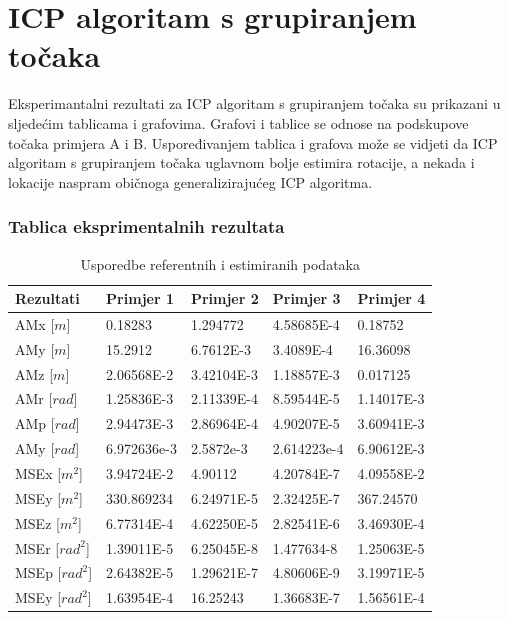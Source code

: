 \section{ICP algoritam s grupiranjem točaka}
Eksperimantalni rezultati za ICP algoritam s grupiranjem točaka su prikazani u sljedećim tablicama i grafovima. Grafovi i tablice se odnose na podskupove točaka primjera A i B. Uspoređivanjem tablica i grafova može se vidjeti da ICP algoritam s grupiranjem točaka uglavnom bolje estimira rotacije, a nekada i lokacije naspram običnoga generalizirajućeg ICP algoritma.

\subsubsection{Tablica eksprimentalnih rezultata}
\begin{table}[H]
  \centering
  \begin{tabular}{ |p{3cm}| |p{2cm}|p{2cm}|p{2cm}|p{2cm}| }
    \hline
    Rezultati& Primjer 1& Primjer 2&Primjer 3& Primjer 4\\
    \hline
    AMx [$m$]& 0.18283& 1.294772& 4.58685E-4& 0.18752\\
    AMy [$m$]& 15.2912& 6.7612E-3& 3.4089E-4& 16.36098\\
    AMz [$m$]& 2.06568E-2& 3.42104E-3& 1.18857E-3& 0.017125\\
    AMr [$rad$]& 1.25836E-3& 2.11339E-4& 8.59544E-5& 1.14017E-3\\
    AMp [$rad$]& 2.94473E-3& 2.86964E-4& 4.90207E-5& 3.60941E-3\\
    AMy [$rad$]& 6.972636e-3& 2.5872e-3& 2.614223e-4& 6.90612E-3\\
    \hline
    MSEx [$m^2$]& 3.94724E-2& 4.90112& 4.20784E-7& 4.09558E-2\\
    MSEy [$m^2$]& 330.869234& 6.24971E-5& 2.32425E-7& 367.24570\\
    MSEz [$m^2$]& 6.77314E-4& 4.62250E-5& 2.82541E-6& 3.46930E-4\\
    MSEr [$rad^2$]& 1.39011E-5& 6.25045E-8& 1.477634-8& 1.25063E-5\\
    MSEp [$rad^2$]& 2.64382E-5& 1.29621E-7& 4.80606E-9& 3.19971E-5\\
    MSEy [$rad^2$]& 1.63954E-4& 16.25243& 1.36683E-7& 1.56561E-4\\
    \hline
  \end{tabular}
  \caption{Usporedbe referentnih i estimiranih podataka}
  \label{res:ref_est_table}
\end{table}
\pagebreak
